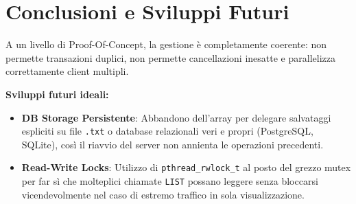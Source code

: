 \documentclass[a4paper,12pt]{article}
\begin{document}
\section{Conclusioni e Sviluppi Futuri}
A un livello di Proof-Of-Concept, la gestione è completamente coerente: non permette transazioni duplici, non permette cancellazioni inesatte e parallelizza correttamente client multipli.

\noindent \textbf{Sviluppi futuri ideali:}
\begin{itemize}
    \item \textbf{DB Storage Persistente}: Abbandono dell'array per delegare salvataggi espliciti su file \texttt{.txt} o database relazionali veri e propri (PostgreSQL, SQLite), così il riavvio del server non annienta le operazioni precedenti.
    \item \textbf{Read-Write Locks}: Utilizzo di \texttt{pthread\_rwlock\_t} al posto del grezzo mutex per far sì che molteplici chiamate \texttt{LIST} possano leggere senza bloccarsi vicendevolmente nel caso di estremo traffico in sola visualizzazione.
\end{itemize}
\end{document}
